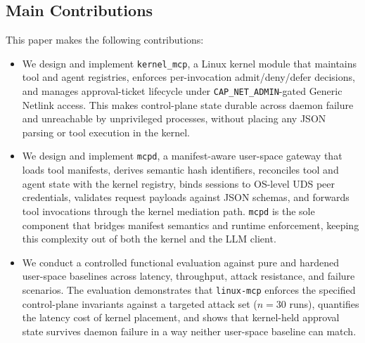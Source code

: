 \noindent



\subsection{Main Contributions}

This paper makes the following contributions:
\begin{itemize}

    \item We design and implement \texttt{kernel\_mcp}, a Linux kernel module that maintains tool and agent registries, enforces per-invocation admit/deny/defer decisions, and manages approval-ticket lifecycle under \texttt{CAP\_NET\_ADMIN}-gated Generic Netlink access.
    This makes control-plane state durable across daemon failure and unreachable by unprivileged processes, without placing any JSON parsing or tool execution in the kernel.

    \item We design and implement \texttt{mcpd}, a manifest-aware user-space gateway that loads tool manifests, derives semantic hash identifiers, reconciles tool and agent state with the kernel registry, binds sessions to OS-level UDS peer credentials, validates request payloads against JSON schemas, and forwards tool invocations through the kernel mediation path.
    \texttt{mcpd} is the sole component that bridges manifest semantics and runtime enforcement, keeping this complexity out of both the kernel and the LLM client.

    \item We conduct a controlled functional evaluation against pure and hardened user-space baselines across latency, throughput, attack resistance, and failure scenarios.
    The evaluation demonstrates that \texttt{linux-mcp} enforces the specified control-plane invariants against a targeted attack set ($n = 30$ runs), quantifies the latency cost of kernel placement, and shows that kernel-held approval state survives daemon failure in a way neither user-space baseline can match.
\end{itemize}
